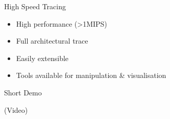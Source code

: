 \begin{frame}{High Speed Tracing}

\begin{itemize}
	\item High performance (>1MIPS)
	\item Full architectural trace
	\item Easily extensible
	\item Tools available for manipulation \& visualisation
\end{itemize}

\end{frame}

\begin{frame}{Short Demo}

(Video)

\end{frame}
